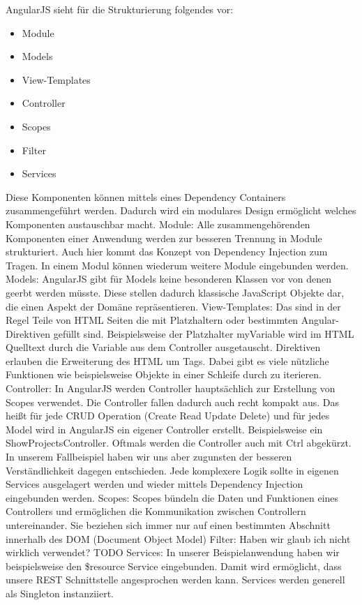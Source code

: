 AngularJS sieht für die Strukturierung folgendes vor:
\begin{itemize}
	\item Module
	\item Models
	\item View-Templates
	\item Controller
	\item Scopes
	\item Filter
	\item Services
\end{itemize}
Diese Komponenten können mittels eines Dependency Containers zusammengeführt werden.
Dadurch wird ein modulares Design ermöglicht welches Komponenten austauschbar macht.
Module:
Alle zusammengehörenden Komponenten einer Anwendung werden zur besseren Trennung in Module strukturiert.
Auch hier kommt das Konzept von Dependency Injection zum Tragen.
In einem Modul können wiederum weitere Module eingebunden werden.
Models:
AngularJS gibt für Models keine besonderen Klassen vor von denen geerbt werden müsste.
Diese stellen dadurch klassische JavaScript Objekte dar, die einen Aspekt der Domäne repräsentieren.
View-Templates:
Das sind in der Regel Teile von HTML Seiten die mit Platzhaltern oder bestimmten Angular-Direktiven gefüllt sind.
Beispielsweise der Platzhalter {{myVariable}} wird im HTML Quelltext durch die Variable aus dem Controller ausgetauscht.
Direktiven erlauben die Erweiterung des HTML um Tags.
Dabei gibt es viele nützliche Funktionen wie beispielsweise Objekte in einer Schleife durch zu iterieren. 
Controller:
In AngularJS werden Controller hauptsächlich zur Erstellung von Scopes verwendet.
Die Controller fallen dadurch auch recht kompakt aus.
Das heißt für jede CRUD Operation (Create Read Update Delete) und für jedes Model wird in AngularJS ein eigener Controller erstellt.
Beispielsweise ein ShowProjectsController.
Oftmals werden die Controller auch mit Ctrl abgekürzt.
In unserem Fallbeispiel haben wir uns aber zugunsten der besseren Verständlichkeit dagegen entschieden.
Jede komplexere Logik sollte in eigenen Services ausgelagert werden und wieder mittels Dependency Injection eingebunden werden. 
Scopes:
Scopes bündeln die Daten und Funktionen eines Controllers und ermöglichen die Kommunikation zwischen Controllern untereinander.
Sie beziehen sich immer nur auf einen bestimmten Abschnitt innerhalb des DOM (Document Object Model)
Filter: Haben wir glaub ich nicht wirklich verwendet? TODO
Services:
In unserer Beispielanwendung haben wir beispielsweise den \$resource Service eingebunden.
Damit wird ermöglicht, dass unsere REST Schnittstelle angesprochen werden kann.
Services werden generell als Singleton instanziiert.

